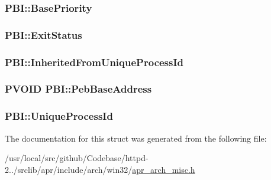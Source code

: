\subsubsection[{\texorpdfstring{Base\+Priority}{BasePriority}}]{ P\+B\+I\+::\+Base\+Priority}\hypertarget{structPBI_a5a3932ba93edb16616d47c2c0c254999}{}\label{structPBI_a5a3932ba93edb16616d47c2c0c254999}
\subsubsection[{\texorpdfstring{Exit\+Status}{ExitStatus}}]{ P\+B\+I\+::\+Exit\+Status}\hypertarget{structPBI_a9b57cf72fceb11a02dfca9daad2647cc}{}\label{structPBI_a9b57cf72fceb11a02dfca9daad2647cc}
\subsubsection[{\texorpdfstring{Inherited\+From\+Unique\+Process\+Id}{InheritedFromUniqueProcessId}}]{ P\+B\+I\+::\+Inherited\+From\+Unique\+Process\+Id}\hypertarget{structPBI_ad0be39a0e592d4764d0b019466a67770}{}\label{structPBI_ad0be39a0e592d4764d0b019466a67770}
\subsubsection[{\texorpdfstring{Peb\+Base\+Address}{PebBaseAddress}}]{\setlength{\rightskip}{0pt plus 5cm}P\+V\+O\+ID P\+B\+I\+::\+Peb\+Base\+Address}\hypertarget{structPBI_a5848b9b53bcd57ebb2c876d7af3e9581}{}\label{structPBI_a5848b9b53bcd57ebb2c876d7af3e9581}
\subsubsection[{\texorpdfstring{Unique\+Process\+Id}{UniqueProcessId}}]{ P\+B\+I\+::\+Unique\+Process\+Id}\hypertarget{structPBI_ab705a75e976b129d6865e231ec46e366}{}\label{structPBI_ab705a75e976b129d6865e231ec46e366}


The documentation for this struct was generated from the following file\+:\begin{DoxyCompactItemize}
\item 
/usr/local/src/github/\+Codebase/httpd-\/2../srclib/apr/include/arch/win32/\hyperlink{win32_2apr__arch__misc_8h}{apr\+\_\+arch\+\_\+misc.\+h}\end{DoxyCompactItemize}
